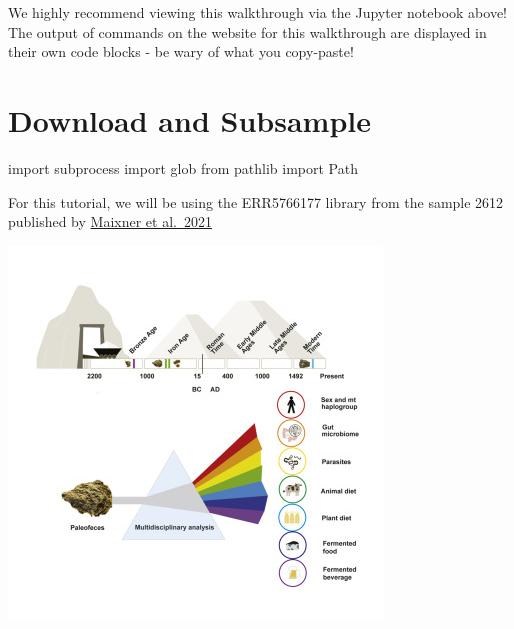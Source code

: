 \documentclass[
  letterpaper,
]{book}
\newenvironment{Shaded}{}{}
\newcommand{\ImportTok}[1]{\textcolor[rgb]{0.01,0.18,0.38}{#1}}
\newcommand{\NormalTok}[1]{\textcolor[rgb]{0.14,0.16,0.18}{#1}}
\begin{document}
\begin{tcolorbox}[enhanced jigsaw, opacitybacktitle=0.6, bottomtitle=1mm, opacityback=0, colback=white, coltitle=black, leftrule=.75mm, toprule=.15mm, title=\textcolor{quarto-callout-warning-color}{\faExclamationTriangle}\hspace{0.5em}{Warning}, colframe=quarto-callout-warning-color-frame, toptitle=1mm, arc=.35mm, left=2mm, titlerule=0mm, breakable, rightrule=.15mm, bottomrule=.15mm, colbacktitle=quarto-callout-warning-color!10!white]

We highly recommend viewing this walkthrough via the Jupyter notebook
above! The output of commands on the website for this walkthrough are
displayed in their own code blocks - be wary of what you copy-paste!

\end{tcolorbox}

\hypertarget{download-and-subsample}{%
\section{Download and Subsample}\label{download-and-subsample}}

\begin{Shaded}
\begin{Highlighting}[]
\ImportTok{import}\NormalTok{ subprocess}
\ImportTok{import}\NormalTok{ glob}
\ImportTok{from}\NormalTok{ pathlib }\ImportTok{import}\NormalTok{ Path}
\end{Highlighting}
\end{Shaded}

For this tutorial, we will be using the ERR5766177 library from the
sample 2612 published by
\href{https://doi.org/10.1016/j.cub.2021.09.031}{Maixner et al.~2021}

\includegraphics{assets/images/chapters/taxonomic-profiling/1-s2.0-S0960982221012719-fx1.jpg}
\end{document}
